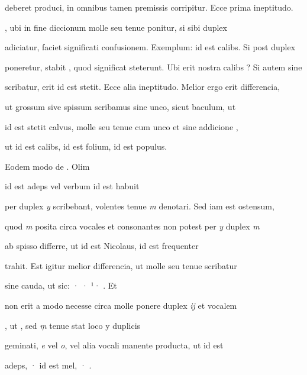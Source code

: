 deberet produci, in omnibus tamen premissis corripitur. Ecce prima ineptitudo. 

, ubi in fine diccionum  molle seu tenue ponitur, si sibi duplex

 adiciatur, faciet significati confusionem. Exemplum:  id est calibs. Si post  duplex 

poneretur, stabit , quod significat steterunt. Ubi erit nostra calibs ? Si autem sine

 scribatur, erit  id est stetit.  Ecce alia ineptitudo. Melior ergo erit differencia,

ut  grossum sive spissum scribamus sine unco, sicut baculum, ut 

 id est stetit calvus,  molle seu tenue cum unco et sine addicione ,

\splitlines
ut  id est calibs,  id est folium,  id est populus.

\indentK Eodem modo de . Olim

\fulllines
{}    id est adeps vel verbum id est habuit

per duplex \textit{y} scribebant, volentes tenue \textit{m} denotari. Sed iam est ostensum,

quod \textit{m} posita circa vocales et consonantes non potest per \textit{y} duplex \textit{m} 

 ab  spisso differre, ut  id est Nicolaus,  id est frequenter

trahit. Est igitur melior differencia, ut  molle seu tenue scribatur

sine cauda, ut sic: · · ¹·  . Et


\fullpreviouslines


{
\color{blue}


non erit a modo necesse circa  molle ponere duplex \textit{ij} et vocalem 

, ut  , sed \textit{ṃ} tenue stat loco y duplicis

geminati, \textit{e} vel \textit{o}, vel alia vocali manente producta, ut  id est

adeps, ·  id est mel, · .

}

